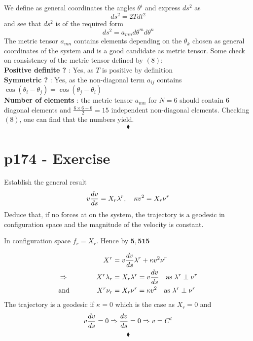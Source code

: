We define as general coordinates the angles $\theta^i$
and express $ds^2$ as 
$$ds^2= 2Tdt^2$$ 
and see that $ds^2$ is of the required form 
$$ds^2= a_{mn}d\theta^md\theta^n$$
The metric tensor $a_{mn}$ contains elements depending on the $\theta_k$ chosen as general coordinates of the system and is a good candidate as metric tensor.
Some check on consistency of the metric tensor defined by $(8)$:\\
\textbf{Positive definite ?} : Yes, as $T$ is positive by definition\\
\textbf{Symmetric ?} : Yes, as the non-diagonal term $a_{ij}$ contains $\cos\left(\theta_i-\theta_j\right) = \cos\left(\theta_j-\theta_i\right)$ \\
\textbf{Number of elements} : the metric tensor $a_{mn}$ for $N=6$ should contain $6$ diagonal elements and $\frac{6\times 6 -6}{2} = 15$ independent non-diagonal elements. Checking $(8)$, one can find that the numbers yield.
$$\blacklozenge$$
\newpage



\section{p174 - Exercise}
\begin{tcolorbox}
Establish the general result
$$v\dv{v}{s}=X_r\lambda^r, \quad \kappa v^2=X_r\nu^r$$
Deduce that, if no forces at on the system, the trajectory is a geodesic in configuration space and the magnitude of the velocity is constant.
\end{tcolorbox}
In configuration space $f_r=X_r$. Hence by $\mathbf{5,515}$

\begin{align}
X^r&=v\dv{v}{s}\lambda^r+\kappa v^2\nu^r\\
\Rightarrow \quad\quad\quad\quad X^r \lambda_r &=X_r\lambda^r = v\dv{v}{s} \quad \text{as } \lambda^r \perp \nu^r\\
\text{and} \quad\quad\quad\quad X^r \nu_r &=X_r\nu^r = \kappa v^2\quad \text{as } \lambda^r \perp \nu^r\\
\end{align}
The trajectory is a geodesic if $\kappa = 0$ which is the case as $X_r=0$ and $$v\dv{v}{s} =0 \Rightarrow \dv{v}{s} =0 \Rightarrow v= C^{t}$$
$$\blacklozenge$$
\newpage


